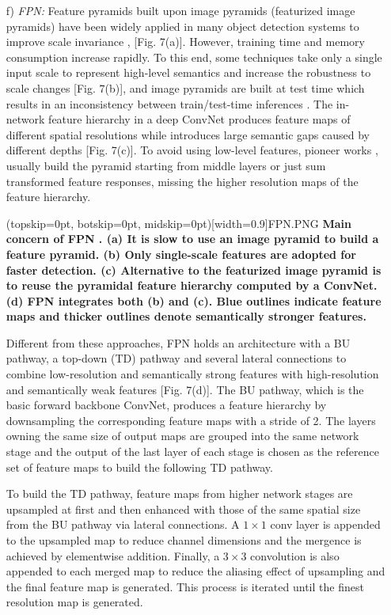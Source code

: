 \documentclass[two column]{ieeeaccess}
\begin{document}
\begin{itemize}
    \item[f)]\textit{FPN: } Feature pyramids built upon image pyramids (featurized image pyramids) have been widely applied in many object detection systems to improve scale invariance \cite{24}, \cite{64} [Fig. 7(a)]. However, training time and memory consumption increase rapidly. To this end, some techniques take only a single input scale to represent high-level semantics and increase the robustness to scale changes [Fig. 7(b)], and image pyramids are built at test time which results in an inconsistency between train/test-time inferences \cite{16,17}. The in-network feature hierarchy in a deep ConvNet produces feature maps of different spatial resolutions while introduces large semantic gaps caused by different depths [Fig. 7(c)]. To avoid using low-level features, pioneer works \cite{71}, \cite{95} usually build the pyramid starting from middle layers or just sum transformed feature responses, missing the higher resolution maps of the feature hierarchy. 
    
    \Figure[ht](topskip=0pt, botskip=0pt, midskip=0pt)[width=0.9\linewidth]{FPN.PNG} {\textbf{ Main concern of FPN \cite{66}. (a) It is slow to use an image pyramid to build a feature pyramid. (b) Only single-scale features are adopted for faster detection. (c) Alternative to the featurized image pyramid is to reuse the pyramidal feature hierarchy computed by a ConvNet. (d) FPN integrates both (b) and (c). Blue outlines indicate feature maps and thicker outlines denote semantically stronger features.}\label{fig7}}
    
    Different from these approaches, FPN \cite{66} holds an architecture with a BU pathway, a top-down (TD) pathway and several lateral connections to combine low-resolution and semantically strong features with high-resolution and semantically weak features [Fig. 7(d)]. The BU pathway, which is the basic forward backbone ConvNet, produces a feature hierarchy by downsampling the corresponding feature maps with a stride of 2. The layers owning the same size of output maps are grouped into the same network stage and the output of the last layer of each stage is chosen as the reference set of feature maps to build the following TD pathway. 
    
    To build the TD pathway, feature maps from higher network stages are upsampled at first and then enhanced with those of the same spatial size from the BU pathway via lateral connections. A $1 \times 1$ conv layer is appended to the upsampled map to reduce channel dimensions and the mergence is achieved by elementwise addition. Finally, a $3 \times 3$ convolution is also appended to each merged map to reduce the aliasing effect of upsampling and the final feature map is generated. This process is iterated until the finest resolution map is generated. 
    

\end{itemize}
\end{document}
